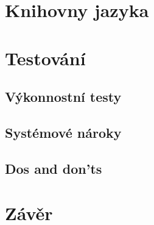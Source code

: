\documentclass{article}
\begin{document}
\section{Knihovny jazyka}
\section{Testování}
\subsection{Výkonnostní testy}
\subsection{Systémové nároky}
\subsection{Dos and don'ts}
\section{Závěr}
\end{document}
